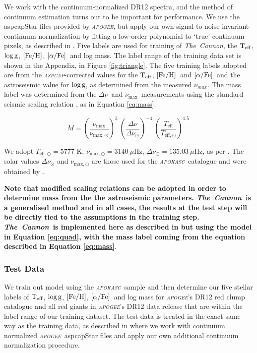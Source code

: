 \documentclass[12pt, preprint]{aastex}
\newcommand{\project}[1]{\textsl{#1}}
\newcommand{\tc}{\project{The~Cannon}}
\newcommand{\apogee}{\project{\textsc{apogee}}}
\newcommand{\apokasc}{\project{\textsc{apokasc}}}
\newcommand{\aspcap}{\project{\textsc{aspcap}}}
\newcommand{\teff}{\mbox{$\rm T_{eff}$}}
\newcommand{\feh}{\mbox{$\rm [Fe/H]$}}
\newcommand{\alphafe}{\mbox{$\rm [\alpha/Fe]$}}
\newcommand{\logg}{\mbox{$\rm \log g$}}
\newcommand{\numax}{$\nu_{\max}$}
\newcommand{\deltanu}{$\Delta\nu$}
\begin{document}
We work with the continuum-normalized DR12 spectra, and the method of continuum
estimation turns out to be important for performance. We use the aspcapStar files provided by \apogee, but apply our own signal-to-noise invariant continuum normalization by fitting a low-order polynomial to `true' continuum pixels, as described in \citet{Ness2015}. 
%
Five labels are used for training of \tc, the \teff, \logg, \feh, \alphafe\ and log mass. The label range of the training data set is shown in the Appendix, in Figure \ref{fig:triangle}. 
 The five training labels adopted are from the \aspcap-corrected values  \citep{Meszaros2013} for the \teff, \feh\ and \alphafe\ and the astroseismic value for \logg, as determined from the measured $\nu_{max}$. The mass label was determined from the  \deltanu\ and \numax\ measurements using the standard seismic scaling relation \citep[e.g.][]{K1995}, as in Equation \ref{eq:mass}. 

\begin{equation} \label{eq:mass}
M= \left( \frac{\nu_{\mathrm{max}}}{\nu_{\mathrm{max,\odot}}}\right)^3\  \left( \frac{\Delta \nu}{\Delta \nu_{\odot}}\right)^{-4} \ \left( \frac{T_{\mathrm{eff}}}{T_{\mathrm{eff,\odot}}}\right)^{1.5} \ 
\end{equation}

We adopt  $T_{\mathrm{eff,\odot}}=5777$ K, $\nu_{\mathrm{max,\odot}}=3140\ \mu$Hz, $\Delta \nu_{\odot}=135.03\ \mu$Hz, as per \citet{Martig2014}. The solar values  $\Delta \nu_{\odot}$ and $\nu_{\mathrm{max,\odot}}$ are those used for the \apokasc\ catalogue and were obtained by \cite{Hekker2013}.

\textbf{Note that modified scaling relations can be adopted in order to determine mass from the the astroseismic parameters. \tc\ is a generalised method and in all cases, the results at the test step will be directly tied to the assumptions in the training step. \tc\ is implemented here as described in \citet{Ness2015} but using the model in Equation \ref{eq:quad}, with the mass label coming from the equation described in Equation \ref{eq:mass}}.  

\subsubsection{Test Data} 

We train out model using the \apokasc\ sample and then determine our five stellar labels of \teff, \logg, \feh, \alphafe\ and log mass for \apogee's DR12 red clump catalogue \citet{Bovy2014} and all red giants in \apogee's DR12 data release that are within the label range of our training dataset.  The test data is treated in the exact same way as the training data, as described in \citet{Ness2015} where we work with continuum normalized \apogee\ aspcapStar files and apply our own additional continuum normalization procedure. 
\end{document}

